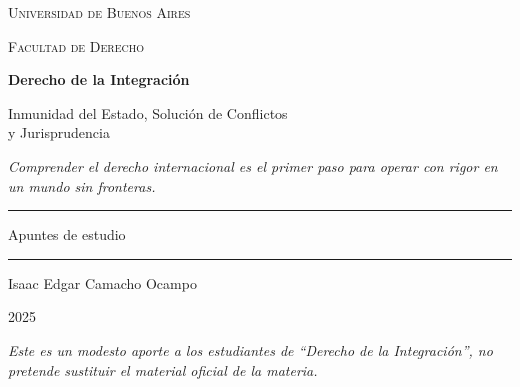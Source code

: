 \documentclass[12pt,oneside]{book}
\newcommand{\universidad}{Universidad de Buenos Aires}
\newcommand{\facultad}{Facultad de Derecho}
\newcommand{\materia}{Derecho de la Integración}
\newcommand{\titulo}{Inmunidad del Estado, Solución de Conflictos\\y Jurisprudencia}
\newcommand{\autor}{Isaac Edgar Camacho Ocampo}
\newcommand{\anio}{2025}
\begin{document}
\begin{titlepage}
\thispagestyle{empty}

\begin{center}

\vspace*{1cm}

{\large \textsc{\universidad}}

\vspace{0.2cm}

{\large \textsc{\facultad}}

\vspace{3cm}

{\Huge \textbf{\materia}}

\vspace{1cm}

{\LARGE \titulo}

\vspace{0.8cm}

\textit{Comprender el derecho internacional es el primer paso para operar con rigor en un mundo sin fronteras.}

\vspace{1.2cm}

\rule{0.70\textwidth}{0.5pt}

\vspace{0.5cm}

{\large Apuntes de estudio}

\vspace{0.5cm}

\rule{0.70\textwidth}{0.5pt}

\vfill

{\large \autor}

\vspace{0.3cm}

{\large \anio}

\end{center}

\vfill

\begin{flushleft}
\textit{Este es un modesto aporte a los estudiantes de ``Derecho de la Integración'', no pretende sustituir el material oficial de la materia.}
\end{flushleft}

\end{titlepage}

\tableofcontents
\thispagestyle{plain}
\end{document}
